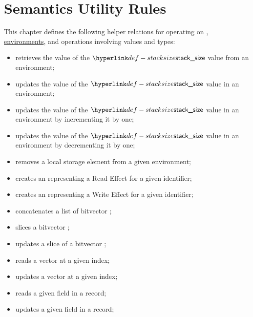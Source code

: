\chapter{Semantics Utility Rules\label{chap:SemanticsUtilityRules}}

This chapter defines the following helper relations for operating on \nativevalues,
\hyperlink{def-envs}{environments}, and operations involving values and types:
\begin{itemize}
  \item {} retrieves the value of the $\stacksize$ value from an environment;
  \item {} updates the value of the $\stacksize$ value in an environment;
  \item {} updates the value of the $\stacksize$ value in an environment by incrementing it by one;
  \item {} updates the value of the $\stacksize$ value in an environment by decrementing it by one;
  \item {} removes a local storage element from a given environment;
  \item {} creates an \executiongraph{} representing a Read Effect for a given identifier;
  \item {} creates an \executiongraph{} representing a Write Effect for a given identifier;
  \item {} concatenates a list of bitvector \nativevalues;
  \item {} slices a bitvector \nativevalue{};
  \item {} updates a slice of a bitvector \nativevalue{};
  \item {} reads a vector \nativevalue{} at a given index;
  \item {} updates a vector \nativevalue{} at a given index;
  \item {} reads a given field in a \nativevalue{} record;
  \item {} updates a given field in a \nativevalue{} record;

\end{itemize}
